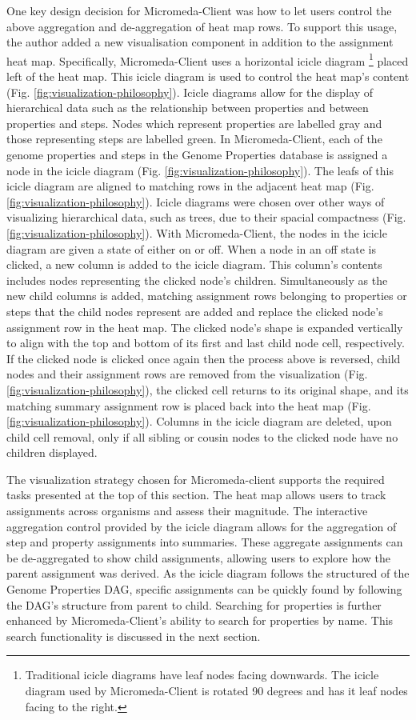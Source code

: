 One key design decision for Micromeda-Client was how to let users control the above aggregation and de-aggregation of heat map rows. To support this usage, the author added a new visualisation component in addition to the assignment heat map. Specifically, Micromeda-Client uses a horizontal icicle diagram \footnote{Traditional icicle diagrams have leaf nodes facing downwards. The icicle diagram used by Micromeda-Client is rotated 90 degrees and has it leaf nodes facing to the right.} placed left of the heat map. This icicle diagram is used to control the heat map's content (Fig. \ref{fig:visualization-philosophy}). Icicle diagrams allow for the display of hierarchical data such as the relationship between properties and between properties and steps. Nodes which represent properties are labelled gray and those representing steps are labelled green. In Micromeda-Client, each of the genome properties and steps in the Genome Properties database is assigned a node in the icicle diagram (Fig. \ref{fig:visualization-philosophy}). The leafs of this icicle diagram are aligned to matching rows in the adjacent heat map (Fig. \ref{fig:visualization-philosophy}). Icicle diagrams were chosen over other ways of visualizing hierarchical data, such as trees, due to their spacial compactness (Fig. \ref{fig:visualization-philosophy}). With Micromeda-Client, the nodes in the icicle diagram are given a state of either on or off. When a node in an off state is clicked, a new column is added to the icicle diagram. This column's contents includes nodes representing the clicked node's children. Simultaneously as the new child columns is added, matching assignment rows belonging to properties or steps that the child nodes represent are added and replace the clicked node's assignment row in the heat map. The clicked node's shape is expanded vertically to align with the top and bottom of its first and last child node cell, respectively. If the clicked node is clicked once again then the process above is reversed, child nodes and their assignment rows are removed from the visualization (Fig. \ref{fig:visualization-philosophy}), the clicked cell returns to its original shape, and its matching summary assignment row is placed back into the heat map (Fig. \ref{fig:visualization-philosophy}). Columns in the icicle diagram are deleted, upon child cell removal, only if all sibling or cousin nodes to the clicked node have no children displayed.

The visualization strategy chosen for Micromeda-client supports the required tasks presented at the top of this section. The heat map allows users to track assignments across organisms and assess their magnitude. The interactive aggregation control provided by the icicle diagram allows for the aggregation of step and property assignments into summaries. These aggregate assignments can be de-aggregated to show child assignments, allowing users to explore how the parent assignment was derived. As the icicle diagram follows the structured of the Genome Properties DAG, specific assignments can be quickly found by following the DAG's structure from parent to child. Searching for properties is further enhanced by Micromeda-Client's ability to search for properties by name. This search functionality is discussed in the next section.

